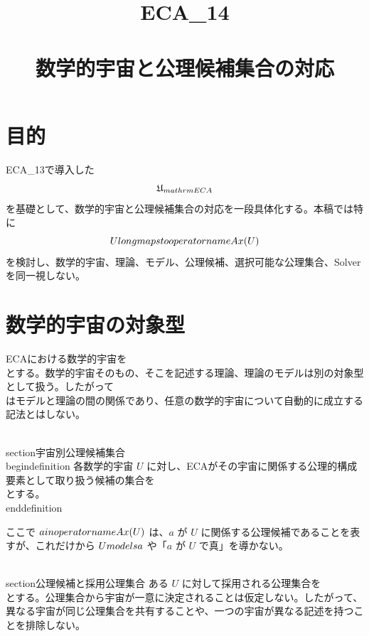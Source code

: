 \documentclass[11pt,a4paper]{article}
\title{ECA_14\\\\数学的宇宙と公理候補集合の対応}
\author{}
\date{}
\newtheorem{definition}{定義}
\begin{document}
\maketitle

\section{目的}
ECA_13で導入した
\[
\mathfrak U_{\\mathrm{ECA}}
\]
を基礎として、数学的宇宙と公理候補集合の対応を一段具体化する。本稿では特に
\[
U\\longmapsto\\operatorname{Ax}(U)
\]
を検討し、数学的宇宙、理論、モデル、公理候補、選択可能な公理集合、Solverを同一視しない。

\section{数学的宇宙の対象型}
ECAにおける数学的宇宙を
\\[
U\\in\\mathfrak U_{\\mathrm{ECA}}
\\]
とする。数学的宇宙そのもの、そこを記述する理論、理論のモデルは別の対象型として扱う。したがって
\\[
M\\models T
\\]
はモデルと理論の間の関係であり、任意の数学的宇宙について自動的に成立する記法とはしない。

\\section{宇宙別公理候補集合}
\\begin{definition}
各数学的宇宙 $U$ に対し、ECAがその宇宙に関係する公理的構成要素として取り扱う候補の集合を
\\[
\\operatorname{Ax}(U)
\\]
とする。
\\end{definition}

ここで $a\\in\\operatorname{Ax}(U)$ は、$a$ が $U$ に関係する公理候補であることを表すが、これだけから $U\\models a$ や「$a$ が $U$ で真」を導かない。

\\section{公理候補と採用公理集合}
ある $U$ に対して採用される公理集合を
\\[
A_U\\subseteq\\operatorname{Ax}(U)
\\]
とする。公理集合から宇宙が一意に決定されることは仮定しない。したがって、異なる宇宙が同じ公理集合を共有することや、一つの宇宙が異なる記述を持つことを排除しない。
\end{document}

